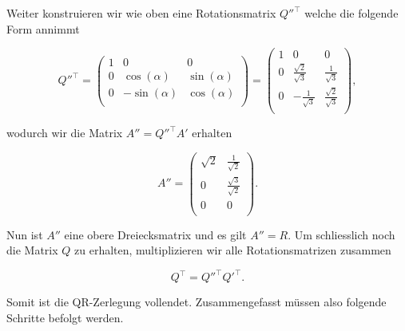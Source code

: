Weiter konstruieren wir wie oben eine Rotationsmatrix \( Q''^\top \) welche die folgende Form annimmt

\begin{equation*}
    Q''^\top = \begin{pmatrix}
        1 & 0 & 0 \\
        0 & \cos(\alpha) & \sin(\alpha) \\
        0 & -\sin(\alpha) & \cos(\alpha) \\
    \end{pmatrix} =
    \begin{pmatrix}
        1 & 0 & 0 \\
        0 & \frac{\sqrt{2}}{\sqrt{3}} & \frac{1}{\sqrt{3}} \\
        0 & -\frac{1}{\sqrt{3}} & \frac{\sqrt{2}}{\sqrt{3}} \\
    \end{pmatrix},
\end{equation*}

wodurch wir die Matrix \( A'' = Q''^\top A' \) erhalten

\begin{equation*}
    A'' =
    \begin{pmatrix}
        \sqrt{2} & \frac{1}{\sqrt{2}} \\
        0 & \frac{\sqrt{3}}{\sqrt{2}} \\
        0 & 0 \\
    \end{pmatrix}.
\end{equation*}

Nun ist \( A'' \) eine obere Dreiecksmatrix und es gilt \( A'' = R \). Um schliesslich noch die Matrix \( Q \) zu erhalten, multiplizieren wir alle Rotationsmatrizen zusammen 

\begin{equation*}
    Q^\top = Q''^\top Q'^\top.
\end{equation*}

Somit ist die QR-Zerlegung vollendet. Zusammengefasst müssen also folgende Schritte befolgt werden. 

